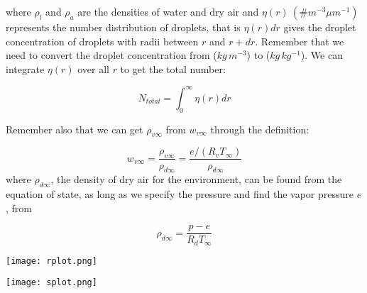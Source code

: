 \documentclass[12pt]{article}
\begin{document}
\noindent
where $\rho_l$ and $\rho_a$ are the densities of water and dry air and
$\eta (r)~(\# m^{-3} \mu m^{-1})$ represents the number distribution
of droplets, that is $\eta (r) dr$ gives the droplet concentration of
droplets with radii between $r$ and $r + dr$.  Remember that we need
to convert the droplet concentration from ($kg\,m^{-3}$) to
($kg\,kg^{-1}$).  We can integrate $\eta(r)$ over all $r$ to get the
total number:

\begin{equation}
  \label{integ}
  N_{total} = \int_0^\infty \eta(r) dr
\end{equation}


Remember also that we can get $\rho_{v \infty}$ from $w_{v \infty}$ through
the definition:

\begin{equation}
  \label{definition}
  w_{v \infty}= \frac{\rho_{v \infty}}{\rho_{d \infty}} = \frac{e/(R_v T_\infty)}{\rho_{d \infty}}
\end{equation}
where $\rho_{d \infty}$, the density of dry air for the environment, can
be found from the equation of state, as long as we specify the pressure
and find the vapor pressure $e$, from 

\begin{equation}
  \label{eq:state}
  \rho_{d \infty} = \frac{p - e}{R_d T_\infty}
\end{equation}

\texttt{[image: rplot.png]}


\texttt{[image: splot.png]}
\end{document}
